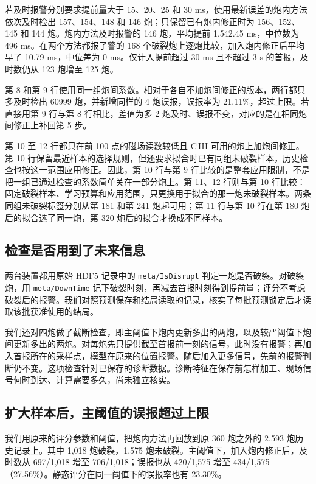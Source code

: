 若及时报警分别要求提前量大于 15、20、25 和 30 ms，使用最新误差的炮内方法依次及时检出 157、154、148 和 146 炮；只保留已有炮内修正时为 156、152、145 和 144 炮。炮内方法及时报警的 146 炮，平均提前 1,542.45 ms，中位数为 496 ms。在两个方法都报了警的 168 个破裂炮上逐炮比较，加入炮内修正后平均早了 10.79 ms，中位差为 0 ms。仅计入提前超过 30 ms 且不超过 3 s 的首报，及时数仍从 123 炮增至 125 炮。

第 8 和第 9 行使用同一组炮间系数。相对于各自不加炮间修正的版本，两行都只多及时检出 60999 炮，并新增同样的 4 炮误报，误报率为 21.11\%，超过上限。若直接用第 9 行与第 8 行相比，差值为多 2 炮及时、误报不变，对应的是在相同炮间修正上补回第 5 步。

第 10 至 12 行都只在前 100 点的磁场读数较低且 C\,III 可用的炮上加炮间修正。第 10 行保留最近样本的选择规则，但还要求拟合时已有同组未破裂样本，历史检查也按这一范围应用修正。因此，第 10 行与第 9 行比较的是整套应用限制，不是把一组已通过检查的系数简单关在一部分炮上。第 11、12 行则与第 10 行比较：固定破裂样本、学习预算和应用范围，只更换用于拟合的那一炮未破裂样本。两条同组未破裂标签分别从第 181 和第 241 炮起可用；第 11 行与第 10 行在第 180 炮后的拟合选了同一炮，第 320 炮后的拟合才换成不同样本。

\subsection{检查是否用到了未来信息}

两台装置都用原始 HDF5 记录中的 \texttt{meta/IsDisrupt} 判定一炮是否破裂。对破裂炮，用 \texttt{meta/DownTime} 记下破裂时刻，再减去首报时刻得到提前量；评分不考虑破裂后的报警。我们对照预测保存和结局读取的记录，核实了每批预测锁定后才读取该批获准使用的结局。

我们还对四炮做了截断检查，即主阈值下炮内更新多出的两炮，以及较严阈值下炮间更新多出的两炮。对每炮先只提供截至首报前一刻的信号，此时没有报警；再加入首报所在的采样点，模型在原来的位置报警。随后加入更多信号，先前的报警判断仍不变。这项检查针对已保存的诊断数据。诊断特征在保存前怎样加工、现场信号何时到达、计算需要多久，尚未独立核实。

\subsection{扩大样本后，主阈值的误报超过上限}

我们用原来的评分参数和阈值，把炮内方法再回放到原 360 炮之外的 2,593 炮历史记录上。其中 1,018 炮破裂，1,575 炮未破裂。主阈值下，加入炮内修正后，及时数从 697/1,018 增至 706/1,018；误报也从 420/1,575 增至 434/1,575（27.56\%）。静态评分在同一阈值下的误报率也有 23.30\%。

